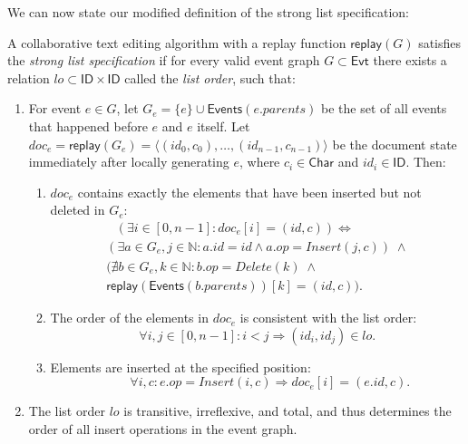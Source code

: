 \documentclass[sigplan,10pt]{acmart}
\begin{document}
We can now state our modified definition of the strong list specification:

\begin{definition}\label{strong-list-spec}
  A collaborative text editing algorithm with a replay function $\mathsf{replay}(G)$ satisfies the \emph{strong list specification} if for every valid event graph $G \subset \mathsf{Evt}$ there exists a relation $\mathit{lo} \subset \mathsf{ID} \times \mathsf{ID}$ called the \emph{list order}, such that:
  \begin{enumerate}
    \item For event $e \in G$, let $G_e = \{e\} \cup \mathsf{Events}(e.\mathit{parents})$ be the set of all events that happened before $e$ and $e$ itself.
    Let $\mathit{doc}_e = \mathsf{replay}(G_e) = \langle (\mathit{id}_0, c_0), \dots, (\mathit{id}_{n-1}, c_{n-1}) \rangle$ be the document state immediately after locally generating $e$, where $c_i \in \mathsf{Char}$ and $\mathit{id}_i \in \mathsf{ID}$. Then:
      \begin{enumerate}
        \item $\mathit{doc}_e$ contains exactly the elements that have been inserted but not deleted in $G_e$:
         \begin{multline*}
             \hspace{9pt}(\exists i \in [0, n-1]: \mathit{doc}_e [i] = (\mathit{id}, c)) \Longleftrightarrow \\
             (\exists a \in G_e, j \in \mathbb{N}: a.\mathit{id} = \mathit{id} \wedge a.\mathit{op} = \mathit{Insert}(j,c)) \;\wedge \\
             (\nexists b \in G_e, k \in \mathbb{N}: b.\mathit{op} = \mathit{Delete}(k) \;\wedge \\
             \mathsf{replay}(\mathsf{Events}(b.\mathit{parents}))[k] = (\mathit{id}, c)).
         \end{multline*}
        \item The order of the elements in $\mathit{doc}_e$ is consistent with the list order:
          \begin{equation*}
            \forall i, j \in [0, n-1]: i<j \Longrightarrow (\mathit{id}_i, \mathit{id}_j) \in \mathit{lo}.
          \end{equation*}
        \item Elements are inserted at the specified position:
          \begin{equation*}
            \qquad\forall i, c: e.\mathit{op} = \mathit{Insert}(i,c) \Longrightarrow \mathit{doc}_e [i] = (e.\mathit{id}, c).
          \end{equation*}
      \end{enumerate}
    \item The list order $\mathit{lo}$ is transitive, irreflexive, and total, and thus determines the order of all insert operations in the event graph.
  \end{enumerate}
\end{definition}
\end{document}
